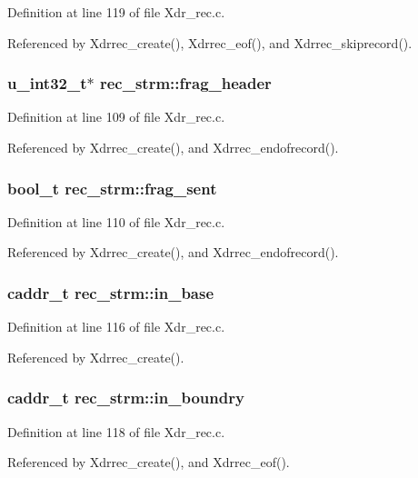 Definition at line 119 of file Xdr\_\-rec.c.

Referenced by Xdrrec\_\-create(), Xdrrec\_\-eof(), and Xdrrec\_\-skiprecord().
\subsubsection{\setlength{\rightskip}{0pt plus 5cm}u\_\-int32\_\-t$\ast$ {\bf rec\_\-strm::frag\_\-header}}\label{structrec__strm_o6}




Definition at line 109 of file Xdr\_\-rec.c.

Referenced by Xdrrec\_\-create(), and Xdrrec\_\-endofrecord().
\subsubsection{\setlength{\rightskip}{0pt plus 5cm}bool\_\-t {\bf rec\_\-strm::frag\_\-sent}}\label{structrec__strm_o7}




Definition at line 110 of file Xdr\_\-rec.c.

Referenced by Xdrrec\_\-create(), and Xdrrec\_\-endofrecord().
\subsubsection{\setlength{\rightskip}{0pt plus 5cm}caddr\_\-t {\bf rec\_\-strm::in\_\-base}}\label{structrec__strm_o10}




Definition at line 116 of file Xdr\_\-rec.c.

Referenced by Xdrrec\_\-create().
\subsubsection{\setlength{\rightskip}{0pt plus 5cm}caddr\_\-t {\bf rec\_\-strm::in\_\-boundry}}\label{structrec__strm_o12}




Definition at line 118 of file Xdr\_\-rec.c.

Referenced by Xdrrec\_\-create(), and Xdrrec\_\-eof().

